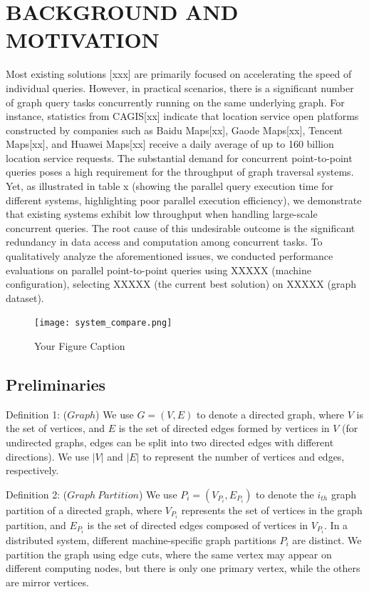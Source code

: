 \documentclass[lettersize,journal]{IEEEtran} %
\begin{document}
\section{BACKGROUND AND MOTIVATION}
Most existing solutions [xxx] are primarily focused on accelerating the speed of individual queries. However, in practical scenarios, there is a significant number of graph query tasks concurrently running on the same underlying graph. For instance, statistics from CAGIS[xx] indicate that location service open platforms constructed by companies such as Baidu Maps[xx], Gaode Maps[xx], Tencent Maps[xx], and Huawei Maps[xx] receive a daily average of up to 160 billion location service requests. The substantial demand for concurrent point-to-point queries poses a high requirement for the throughput of graph traversal systems. Yet, as illustrated in table x (showing the parallel query execution time for different systems, highlighting poor parallel execution efficiency), we demonstrate that existing systems exhibit low throughput when handling large-scale concurrent queries. The root cause of this undesirable outcome is the significant redundancy in data access and computation among concurrent tasks. To qualitatively analyze the aforementioned issues, we conducted performance evaluations on parallel point-to-point queries using XXXXX (machine configuration), selecting XXXXX (the current best solution) on XXXXX (graph dataset).
\graphicspath{{E:/华科实验室论文/MyDocument/并发点对点查询/论文草稿/picture/}}

\begin{figure}[t]
    \centering
    \texttt{[image: system\_compare.png]}
    \caption{Your Figure Caption}
    \label{fig:your_label}
  \end{figure}

\subsection{Preliminaries}
Definition 1: ($Graph$) We use $G=(V,E)$ to denote a directed graph, where $V$ is the set of vertices, and $E$ is the set of directed edges formed by vertices in $V$ (for undirected graphs, edges can be split into two directed edges with different directions). We use $|V|$ and $|E|$ to represent the number of vertices and edges, respectively.

Definition 2: ($Graph~Partition$) We use $P_i=(V_{P_i},E_{P_i})$ to denote the $i_{th}  $ graph partition of a directed graph, where $V_{P_i}$ represents the set of vertices in the graph partition, and $E_{P_i}$ is the set of directed edges composed of vertices in $V_{P_i}$. In a distributed system, different machine-specific graph partitions $P_i$ are distinct. We partition the graph using edge cuts, where the same vertex may appear on different computing nodes, but there is only one primary vertex, while the others are mirror vertices.
\end{document}
